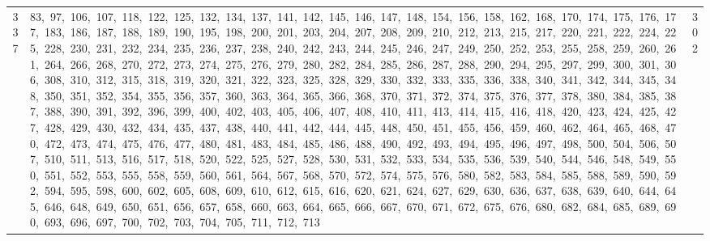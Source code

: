 \begin{longtable}{c|p{}|r}
337 & 83,\ 97,\ 106,\ 107,\ 118,\ 122,\ 125,\ 132,\ 134,\ 137,\ 141,\ 142,\ 145,\ 146,\ 147,\ 148,\ 154,\ 156,\ 158,\ 162,\ 168,\ 170,\ 174,\ 175,\ 176,\ 177,\ 183,\ 186,\ 187,\ 188,\ 189,\ 190,\ 195,\ 198,\ 200,\ 201,\ 203,\ 204,\ 207,\ 208,\ 209,\ 210,\ 212,\ 213,\ 215,\ 217,\ 220,\ 221,\ 222,\ 224,\ 225,\ 228,\ 230,\ 231,\ 232,\ 234,\ 235,\ 236,\ 237,\ 238,\ 240,\ 242,\ 243,\ 244,\ 245,\ 246,\ 247,\ 249,\ 250,\ 252,\ 253,\ 255,\ 258,\ 259,\ 260,\ 261,\ 264,\ 266,\ 268,\ 270,\ 272,\ 273,\ 274,\ 275,\ 276,\ 279,\ 280,\ 282,\ 284,\ 285,\ 286,\ 287,\ 288,\ 290,\ 294,\ 295,\ 297,\ 299,\ 300,\ 301,\ 306,\ 308,\ 310,\ 312,\ 315,\ 318,\ 319,\ 320,\ 321,\ 322,\ 323,\ 325,\ 328,\ 329,\ 330,\ 332,\ 333,\ 335,\ 336,\ 338,\ 340,\ 341,\ 342,\ 344,\ 345,\ 348,\ 350,\ 351,\ 352,\ 354,\ 355,\ 356,\ 357,\ 360,\ 363,\ 364,\ 365,\ 366,\ 368,\ 370,\ 371,\ 372,\ 374,\ 375,\ 376,\ 377,\ 378,\ 380,\ 384,\ 385,\ 387,\ 388,\ 390,\ 391,\ 392,\ 396,\ 399,\ 400,\ 402,\ 403,\ 405,\ 406,\ 407,\ 408,\ 410,\ 411,\ 413,\ 414,\ 415,\ 416,\ 418,\ 420,\ 423,\ 424,\ 425,\ 427,\ 428,\ 429,\ 430,\ 432,\ 434,\ 435,\ 437,\ 438,\ 440,\ 441,\ 442,\ 444,\ 445,\ 448,\ 450,\ 451,\ 455,\ 456,\ 459,\ 460,\ 462,\ 464,\ 465,\ 468,\ 470,\ 472,\ 473,\ 474,\ 475,\ 476,\ 477,\ 480,\ 481,\ 483,\ 484,\ 485,\ 486,\ 488,\ 490,\ 492,\ 493,\ 494,\ 495,\ 496,\ 497,\ 498,\ 500,\ 504,\ 506,\ 507,\ 510,\ 511,\ 513,\ 516,\ 517,\ 518,\ 520,\ 522,\ 525,\ 527,\ 528,\ 530,\ 531,\ 532,\ 533,\ 534,\ 535,\ 536,\ 539,\ 540,\ 544,\ 546,\ 548,\ 549,\ 550,\ 551,\ 552,\ 553,\ 555,\ 558,\ 559,\ 560,\ 561,\ 564,\ 567,\ 568,\ 570,\ 572,\ 574,\ 575,\ 576,\ 580,\ 582,\ 583,\ 584,\ 585,\ 588,\ 589,\ 590,\ 592,\ 594,\ 595,\ 598,\ 600,\ 602,\ 605,\ 608,\ 609,\ 610,\ 612,\ 615,\ 616,\ 620,\ 621,\ 624,\ 627,\ 629,\ 630,\ 636,\ 637,\ 638,\ 639,\ 640,\ 644,\ 645,\ 646,\ 648,\ 649,\ 650,\ 651,\ 656,\ 657,\ 658,\ 660,\ 663,\ 664,\ 665,\ 666,\ 667,\ 670,\ 671,\ 672,\ 675,\ 676,\ 680,\ 682,\ 684,\ 685,\ 689,\ 690,\ 693,\ 696,\ 697,\ 700,\ 702,\ 703,\ 704,\ 705,\ 711,\ 712,\ 713 & 302 \\

\end{longtable}
